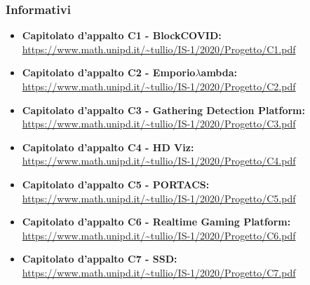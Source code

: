 \subsubsection{Informativi}

\begin{itemize}
\item \textbf {Capitolato d'appalto C1 - BlockCOVID:}\\
\url{https://www.math.unipd.it/~tullio/IS-1/2020/Progetto/C1.pdf}
\item \textbf {Capitolato d'appalto C2 - Emporio$\lambda$ambda:}\\
\url{https://www.math.unipd.it/~tullio/IS-1/2020/Progetto/C2.pdf}
\item \textbf {Capitolato d'appalto C3 - Gathering Detection Platform:}\\
\url{https://www.math.unipd.it/~tullio/IS-1/2020/Progetto/C3.pdf}
\item \textbf {Capitolato d'appalto C4 - HD Viz:}\\
\url{https://www.math.unipd.it/~tullio/IS-1/2020/Progetto/C4.pdf}
\item \textbf {Capitolato d'appalto C5 - PORTACS:}\\
\url{https://www.math.unipd.it/~tullio/IS-1/2020/Progetto/C5.pdf}
\item \textbf {Capitolato d'appalto C6 - Realtime Gaming Platform:}\\
\url{https://www.math.unipd.it/~tullio/IS-1/2020/Progetto/C6.pdf}
\item \textbf {Capitolato d'appalto C7 - SSD:}\\
\url{https://www.math.unipd.it/~tullio/IS-1/2020/Progetto/C7.pdf}

\end{itemize}